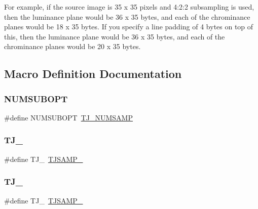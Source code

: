 For example, if the source image is 35 x 35 pixels and 4\+:2\+:2 subsampling is used, then the luminance plane would be 36 x 35 bytes, and each of the chrominance planes would be 18 x 35 bytes. If you specify a line padding of 4 bytes on top of this, then the luminance plane would be 36 x 35 bytes, and each of the chrominance planes would be 20 x 35 bytes. 

\subsection{Macro Definition Documentation}
\mbox{\label{group___turbo_j_p_e_g_ga35ff7fc477ba0b7c2e5a5aaade105ed0}} 
\subsubsection{\texorpdfstring{N\+U\+M\+S\+U\+B\+O\+PT}{NUMSUBOPT}}
{\footnotesize\ttfamily \#define N\+U\+M\+S\+U\+B\+O\+PT~\hyperlink{group___turbo_j_p_e_g_ga5ef3d169162ce77ce348e292a0b7477c}{T\+J\+\_\+\+N\+U\+M\+S\+A\+MP}}

\mbox{\label{group___turbo_j_p_e_g_ga5d60f3d82faeb4158eac13981862a46c}} 
\subsubsection{\texorpdfstring{T\+J\+\_}{TJ\_411}}
{\footnotesize\ttfamily \#define T\+J\+\_~\hyperlink{group___turbo_j_p_e_g_gga1d047060ea80bb9820d540bb928e9074a63085dbf683cfe39e513cdb6343e3737}{T\+J\+S\+A\+M\+P\+\_}}

\mbox{\label{group___turbo_j_p_e_g_gafae617ab226e88492ae5c5708e52503f}} 
\subsubsection{\texorpdfstring{T\+J\+\_}{TJ\_420}}
{\footnotesize\ttfamily \#define T\+J\+\_~\hyperlink{group___turbo_j_p_e_g_gga1d047060ea80bb9820d540bb928e9074a63085dbf683cfe39e513cdb6343e3737}{T\+J\+S\+A\+M\+P\+\_}}

